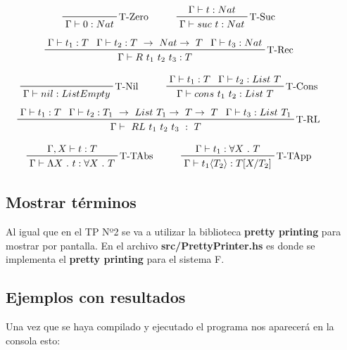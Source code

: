 \documentclass[12pt, titlepage, a4paper]{article}
\begin{document}
\begin{displaymath}
    \prftree[r]{T-Zero}{\Gamma \vdash 0 : Nat} \hspace{1cm}
    \prftree[r]{T-Suc}{\Gamma \vdash t : Nat}{\Gamma \vdash suc \ t : Nat} \hspace{1cm}
\end{displaymath}
\begin{displaymath}
    \prftree[r]{T-Rec}{\Gamma \vdash t_1 : T}{\Gamma \vdash t_2 : T \ \rightarrow \ Nat \rightarrow \ T}{\Gamma \vdash t_3 : Nat}{\Gamma \vdash R \ t_1 \ t_2 \ t_3 : T} \hspace{1cm}
\end{displaymath}

\begin{displaymath}
    \prftree[r]{T-Nil}{\Gamma \vdash nil : ListEmpty} \hspace{1cm}
    \prftree[r]{T-Cons}{\Gamma \vdash t_1 : T}{\Gamma \vdash t_2 : List \ T}{\Gamma \vdash cons \ t_1 \ t_2 :  List \ T} \hspace{1cm}
\end{displaymath}
\begin{displaymath}
    \prftree[r]{T-RL}{\Gamma \vdash t_1 : T}{\Gamma \vdash t_2 : T_1 \ \rightarrow \ List \ T_1 \rightarrow \ T \rightarrow \ T}{\Gamma \vdash t_3 : List \ T_1}{\Gamma \vdash \ RL \ t_1 \ t_2 \ t_3 \ : \ T} \hspace{1cm}
\end{displaymath}

\begin{displaymath}
    \prftree[r]{T-TAbs}{\Gamma, X \vdash t : T}{\Gamma \vdash \Lambda X \ . \ t : \forall X \ . \ T} \hspace{1cm}
    \prftree[r]{T-TApp}{\Gamma \vdash t_1 : \forall X \ . \ T}{\Gamma \vdash t_1 \langle T_2 \rangle : T[X/T_2]} \hspace{1cm}
\end{displaymath}

\subsection{Mostrar términos}
Al igual que en el TP Nº2 \cite{tp2:lambdaCalculoSimpleTipado} se va a utilizar la biblioteca \textbf{pretty printing} para mostrar por 
pantalla. En el archivo
\textbf{src/PrettyPrinter.hs} es donde se implementa el \textbf{pretty printing} para el sistema F.

\subsection{Ejemplos con resultados}
Una vez que se haya compilado y ejecutado el programa nos aparecerá en la consola esto:
\end{document}

